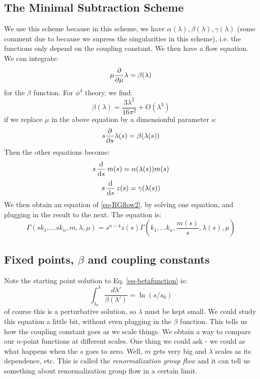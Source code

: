 \subsection{The Minimal Subtraction Scheme}
We use this scheme because in this scheme, we have $\alpha(\lambda), \beta(\lambda), \gamma(\lambda)$ (some comment due to because we supress the singularities in this scheme), i.e. the functions only depend on the coupling constant. We then have a flow equation. We can integrate:
\begin{equation}\label{eq-betafunction}
    \mu\frac{\partial }{\partial \mu}\lambda = \beta(\lambda)
\end{equation}
for the $\beta$ function. For $\phi^4$ theory, we find:
\begin{equation}
    \beta(\lambda) = \frac{3\lambda^2}{16\pi^2} + O(\lambda^3)
\end{equation}
if we replace $\mu$ in the above equation by a dimensionful parameter $s$:
\begin{equation}
    s\frac{\partial }{\partial s}\lambda(s) = \beta(\lambda(s))
\end{equation}
Then the other equations become:
\begin{equation}
    s\dod{}{s}m(s) = \alpha(\lambda(s))m(s)
\end{equation}
\begin{equation}
    s\dod{}{s}z(s) = \gamma(\lambda(s))
\end{equation}
We then obtain an equation of \eqref{eq-RGflow2}, by solving one equation, and plugging in the result to the next. The equation is:
\begin{equation}
    \Gamma(sk_1, \ldots sk_n, m, \lambda, \mu) = s^{n-4}z(s)\Gamma(k_1, \ldots k_n, \frac{m(s)}{s}, \lambda(s), \mu)
\end{equation}

\subsection{Fixed points, $\beta$ and coupling constants}
Note the starting point solution to Eq. \eqref{eq-betafunction} is:
\begin{equation}
    \int_{\lambda_0}^\lambda \frac{d\lambda'}{\beta(\lambda')} = \ln (s/s_0)
\end{equation}
of course this is a perturbative solution, so $\lambda$ must be kept small. We could study this equation a little bit, without even plugging in the $\beta$ function. This tells us how the coupling constant goes as we scale things. We obtain a way to compare our $n$-point functions at different scales. One thing we could ask - we could as what happens when the $s$ goes to zero. Well, $m$ gets very big and $\lambda$ scales as its dependence, etc. This is called the \emph{renormalization group flow} and it can tell us something about renormalization group flow in a certain limit.

